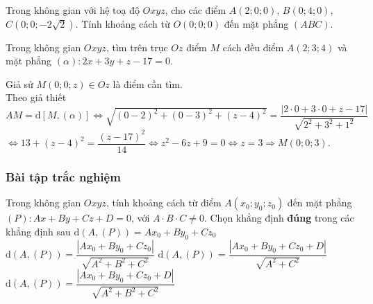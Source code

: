 \begin{vd}%
	Trong không gian với hệ toạ độ $Oxyz$, cho các điểm $A(2;0;0)$, $B(0;4;0)$, $C(0;0;-2\sqrt{2})$. Tính khoảng cách từ $O(0;0;0)$ đến mặt phẳng $(ABC)$.

\end{vd}
\begin{vd}%
	Trong không gian $Oxyz$, tìm trên trục $Oz$ điểm $M$ cách đều điểm $A(2;3;4)$ và mặt phẳng $(\alpha )\colon 2x+3y+z-17=0.$

	\loigiai
	{Giả sử $M(0;0;z )\in Oz$ là điểm cần tìm.\\
		Theo giả thiết $AM=\mathrm{d}\left[ M,(\alpha ) \right]\Leftrightarrow \sqrt{(0-2 )^2+(0-3 )^2+(z-4 )^2}=\dfrac{\left| 2\cdot0+3\cdot0+z-17 \right|}{\sqrt{2^2+3^2+1^2}}$\\
		$\Leftrightarrow 13+(z-4 )^2=\dfrac{(z-17 )^2}{14}\Leftrightarrow z^2-6z+9=0\Leftrightarrow z=3\Rightarrow M(0;0;3)$.}
\end{vd}
\subsubsection{Bài tập trắc nghiệm}
\begin{ex}%
	Trong không gian $Oxyz$, tính khoảng cách từ điểm  $A\left(x_0;y_0;z_0\right)$ đến mặt phẳng $(P)\colon Ax+By+Cz+D=0$, với $A\cdot B\cdot C\ne 0$. Chọn khẳng định \textbf{đúng} trong các khẳng định sau
	\choice
	{$\mathrm{d}\left(A,(P)\right)=Ax_0+By_0+Cz_0$}
	{$\mathrm{d}\left(A,(P)\right)=\dfrac{\left|{Ax_0+By_0+Cz_0}\right|}{\sqrt{A^2+B^2+C^2}}$}
	{$\mathrm{d}\left(A,(P)\right)=\dfrac{\left|{Ax_0+By_0+Cz_0+D}\right|}{\sqrt{A^2+C^2}}$}
	{\True $\mathrm{d}\left(A,(P)\right)=\dfrac{\left|{Ax_0+By_0+Cz_0+D}\right|}{\sqrt{A^2+B^2+C^2}}$}
\end{ex}

